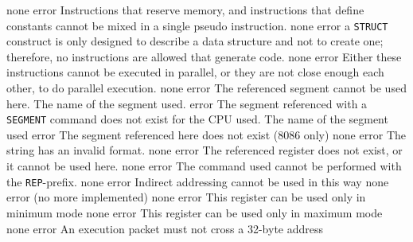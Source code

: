 \documentclass[12pt,twoside]{report}
\newcommand{\tty}[1]{{\tt #1}}
\begin{document}
\begin{description}
               {none}
               {error}
               {Instructions that reserve memory, and instructions that define
                constants cannot be mixed in a single pseudo instruction.}
               {none}
               {error}
               {a \tty{STRUCT} construct is only designed to describe a
                data structure and not to create one; therefore, no
                instructions are allowed that generate code.}
               {none}
               {error}
               {Either these instructions cannot be executed in parallel,
                or they are not close enough each other, to do parallel
                execution.}
               {none}
               {error}
               {The referenced segment cannot be used here.}
               {The name of the segment used.}
               {error}
               {The segment referenced with a \tty{SEGMENT} command does not
                exist for the CPU used.}
               {The name of the segment used}
               {error}
               {The segment referenced here does not exist (8086 only)}
               {none}
               {error}
               {The string has an invalid format.}
               {none}
               {error}
               {The referenced register does not exist, or it cannot
                be used here.}
               {none}
               {error}
               {The command used cannot be performed with the \tty{REP}-prefix.}
               {none}
               {error}
               {Indirect addressing cannot be used in this way}
               {none}
               {error}
               {(no more implemented)}
               {none}
               {error}
               {This register can be used only in minimum mode}
               {none}
               {error}
               {This register can be used only in maximum mode}
               {none}
               {error}
               {An execution packet must not cross a 32-byte address
}
\end{description}
\end{document}
